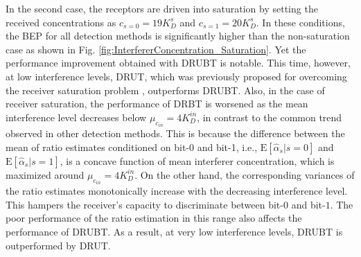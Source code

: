 \documentclass[twocolumn]{IEEEtran}
\newcommand{\E}{\mathrm{E}}
\begin{document}
In the second case, the receptors are driven into saturation by setting the received concentrations as $c_{s=0} = 19K_D^s$ and $c_{s=1} = 20K_D^s$. In these conditions, the BEP for all detection methods is significantly higher than the non-saturation case as shown in Fig. \ref{fig:InterfererConcentration_Saturation}. Yet the performance improvement obtained with DRUBT is notable. This time, however, at low interference levels, DRUT, which was previously proposed for overcoming the receiver saturation problem \cite{kuscu2018maximum}, outperforms DRUBT.  
Also, in the case of receiver saturation, the performance of DRBT is worsened as the mean interference level decreases below $\mu_{c_{in}} = 4 K_D^{in}$, in contrast to the common trend observed in other detection methods. This is because the difference between the mean of ratio estimates conditioned on bit-0 and bit-1, i.e., $\E[\hat{\alpha}_s|s=0]$ and $\E[\hat{\alpha}_s|s=1]$, is a concave function of mean interferer concentration, which is maximized around $\mu_{c_{in}} = 4 K_D^{in}$. On the other hand, the corresponding variances of the ratio estimates monotonically increase with the decreasing interference level. This hampers the receiver's capacity to discriminate between bit-$0$ and bit-$1$. The poor performance of the ratio estimation in this range also affects the performance of DRUBT. As a result, at very low interference levels, DRUBT is outperformed by DRUT. 



\end{document}
